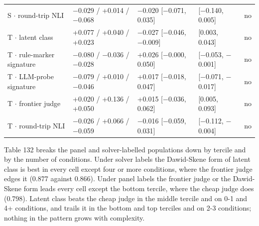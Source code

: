 \documentclass[11pt,letterpaper]{article}
\begin{document}
{\begin{longtable}
{}S $\cdot$ round-trip NLI & $-$0.029 / +0.014 / $-$0.068 & $-$0.020 [$-$0.071, 0.035] & [$-$0.140, 0.005] & no \\
{}T $\cdot$ latent class & +0.077 / +0.040 / +0.023 & $-$0.027 [$-$0.046, $-$0.009] & [0.003, 0.043] & no \\
{}T $\cdot$ rule-marker signature & $-$0.080 / $-$0.036 / $-$0.028 & +0.026 [$-$0.000, 0.050] & [$-$0.053, $-$0.001] & no \\
{}T $\cdot$ LLM-probe signature & $-$0.079 / +0.010 / $-$0.046 & +0.017 [$-$0.018, 0.047] & [$-$0.071, $-$0.017] & no \\
{}T $\cdot$ frontier judge & +0.020 / +0.136 / +0.050 & +0.015 [$-$0.036, 0.062] & [0.005, 0.093] & no \\
{}T $\cdot$ round-trip NLI & $-$0.026 / +0.066 / $-$0.059 & $-$0.016 [$-$0.059, 0.031] & [$-$0.112, $-$0.004] & no \\
\end{longtable}
}

Table 132 breaks the panel and solver-labelled populations down by tercile and by the number of conditions. Under solver labels the Dawid-Skene form of latent class is best in every cell except four or more conditions, where the frontier judge edges it (0.877 against 0.866). Under panel labels the frontier judge or the Dawid-Skene form leads every cell except the bottom tercile, where the cheap judge does (0.798). Latent class beats the cheap judge in the middle tercile and on 0-1 and 4+ conditions, and trails it in the bottom and top terciles and on 2-3 conditions; nothing in the pattern grows with complexity.
\end{document}
